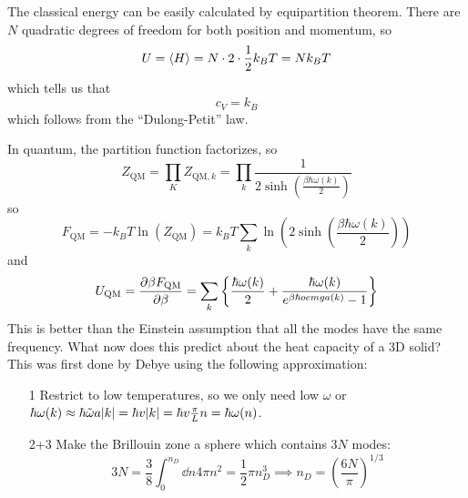 \documentclass[a4paper,twoside,master.tex]{subfiles}
\begin{document}
The classical energy can be easily calculated by equipartition theorem. There are $ N $ quadratic degrees of freedom for both position and momentum, so
\begin{equation}
    U = \ev{H} = N \cdot 2 \cdot \frac{1}{2} k_{B} T = N k_B T
\end{equation}
which tells us that
\begin{equation}
    c_V = k_B
\end{equation}
which follows from the ``Dulong-Petit'' law.


In quantum, the partition function factorizes, so
\begin{equation}
    Z_{\text{QM}} = \prod_K Z_{\text{QM}, k} = \prod_k \frac{1}{2 \sinh(\frac{\beta \hbar \omega(k)}{2})}
\end{equation}
so
\begin{equation}
    F_{\text{QM}} = - k_{B} T \ln(Z_{\text{QM}}) = k_B T \sum_k \ln(2 \sinh(\frac{\beta \hbar \omega(k)}{2}))
\end{equation}
and
\begin{equation}
    U_{\text{QM}} = \pdv{\beta F_{\text{QM}}}{\beta} = \sum_k \left\{ \frac{\hbar \omega(k)}{2} + \frac{\hbar \omega(k)}{e^{\beta \hbar oemga(k)} - 1} \right\}
\end{equation}
This is better than the Einstein assumption that all the modes have the same frequency. What now does this predict about the heat capacity of a 3D solid? This was first done by Debye using the following approximation:
\begin{itemize}
    \item[1] Restrict to low temperatures, so we only need low $ \omega $ or $ \hbar \omega(k) \approx \hbar \tilde{\omega} a \abs{k} = \hbar v \abs{k} = \hbar v \frac{\pi}{L} n = \hbar \omega(n) $.
    \item[2+3] Make the Brillouin zone a sphere which contains $ 3N $ modes:
        \begin{equation}
            3N = \frac{3}{8} \int_0^{n_D} \dd{n} 4 \pi n^2 = \frac{1}{2} \pi n_D^3 \implies n_D = \left(\frac{6N}{\pi}\right)^{1/3}
        \end{equation}
\end{itemize}
\end{document}

